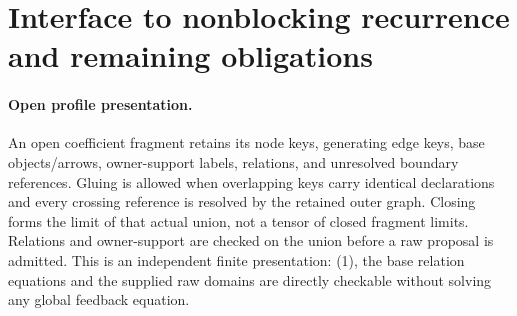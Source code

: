 \documentclass[11pt]{article}
\begin{document}
\section{Interface to nonblocking recurrence and remaining obligations}
\paragraph{Open profile presentation.}
An open coefficient fragment retains its node keys, generating edge keys, base objects/arrows, owner-support labels, relations, and unresolved boundary references. Gluing is allowed when overlapping keys carry identical declarations and every crossing reference is resolved by the retained outer graph. Closing forms the limit of that actual union, not a tensor of closed fragment limits. Relations and owner-support are checked on the union before a raw proposal is admitted. This is an independent finite presentation: (1), the base relation equations and the supplied raw domains are directly checkable without solving any global feedback equation.
\end{document}
